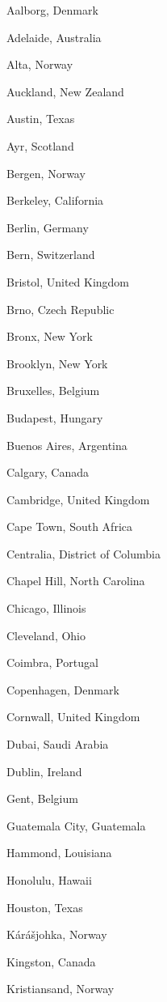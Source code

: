 \documentclass[20pt,landscape]{foils}
\begin{document}
\begin{list1}
  \begin{list2}
  \item Aalborg, Denmark
  \item Adelaide, Australia
  \item Alta, Norway
  \item Auckland, New Zealand
  \item Austin, Texas
  \item Ayr, Scotland
  \item Bergen, Norway
  \item Berkeley, California
  \item Berlin, Germany
  \item Bern, Switzerland
  \item Bristol, United Kingdom
  \item Brno, Czech Republic
  \item Bronx, New York
  \item Brooklyn, New York
  \item Bruxelles, Belgium
  \item Budapest, Hungary
  \item Buenos Aires, Argentina
  \item Calgary, Canada
  \item Cambridge, United Kingdom
  \item Cape Town, South Africa
  \item Centralia, District of Columbia
  \item Chapel Hill, North Carolina
  \item Chicago, Illinois
  \item Cleveland, Ohio
  \item Coimbra, Portugal
  \item Copenhagen, Denmark
  \item Cornwall, United Kingdom
  \item Dubai, Saudi Arabia
  \item Dublin, Ireland
  \item Gent, Belgium
  \item Guatemala City, Guatemala
  \item Hammond, Louisiana
  \item Honolulu, Hawaii
  \item Houston, Texas
  \item Kárášjohka, Norway
  \item Kingston, Canada
  \item Kristiansand, Norway

\end{list2}
\end{list1}
\end{document}
